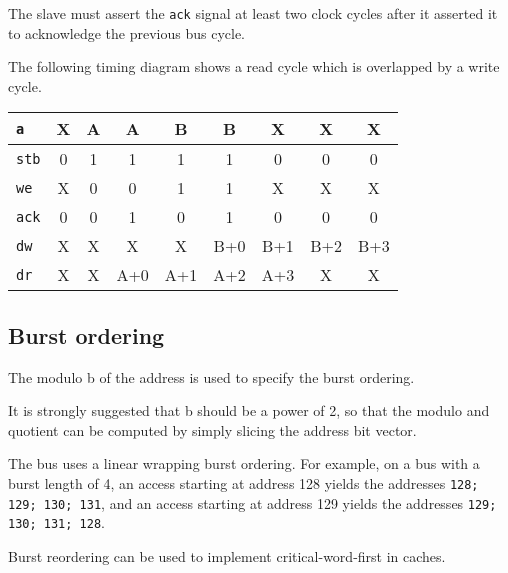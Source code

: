 \documentclass[a4paper,11pt]{article}
\begin{document}
The slave must assert the \verb!ack! signal at least two clock cycles after it asserted it to acknowledge the previous bus cycle.

The following timing diagram shows a read cycle which is overlapped by a write cycle.

\begin{tabular}{|l|c|c|c|c|c|c|c|c|}
\hline
\verb!a! & X & A & A & B & B & X & X & X\\
\hline
\verb!stb! & 0 & 1 & 1 & 1 & 1 & 0 & 0 & 0\\
\hline
\verb!we! & X & 0 & 0 & 1 & 1 & X & X & X \\
\hline
\verb!ack! & 0 & 0 & 1 & 0 & 1 & 0 & 0 & 0 \\
\hline
\verb!dw! & X & X & X & X & B+0 & B+1 & B+2 & B+3 \\
\hline
\verb!dr! & X & X & A+0 & A+1 & A+2 & A+3 & X & X \\
\hline
\end{tabular}


\subsection{Burst ordering}
The modulo b of the address is used to specify the burst ordering.

It is strongly suggested that b should be a power of 2, so that the modulo and quotient can be computed by simply slicing the address bit vector.

The bus uses a linear wrapping burst ordering. For example, on a bus with a burst length of 4, an access starting at address 128 yields the addresses \verb!128; 129; 130; 131!, and an access starting at address 129 yields the addresses \verb!129; 130; 131; 128!.

Burst reordering can be used to implement critical-word-first in caches.
\end{document}
